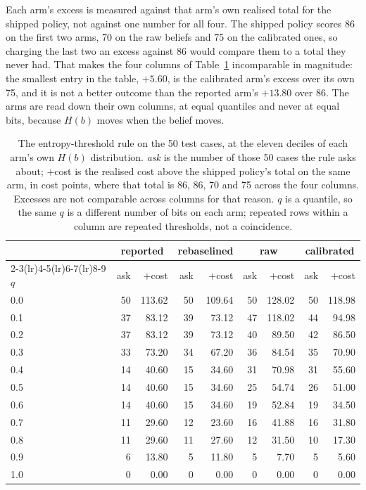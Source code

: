 \documentclass{article}
\begin{document}
Each arm's excess is measured against that arm's own realised total for the shipped
policy, not against one number for all four. The shipped policy scores 86 on the
first two arms, 70 on the raw beliefs and 75 on the calibrated ones, so charging the
last two an excess against 86 would compare them to a total they never had. That
makes the four columns of Table~\ref{tab:entropy} incomparable in magnitude: the
smallest entry in the table, $+5.60$, is the calibrated arm's excess over its own
75, and it is not a better outcome than the reported arm's $+13.80$ over 86. The
arms are read down their own columns, at equal quantiles and never at equal bits,
because $H(b)$ moves when the belief moves.

\begin{table}[t]
\centering
\setlength{\tabcolsep}{3pt}
\small
\begin{tabular}{lrrrrrrrr}
\toprule
& \multicolumn{2}{c}{reported} & \multicolumn{2}{c}{rebaselined}
& \multicolumn{2}{c}{raw} & \multicolumn{2}{c}{calibrated} \\
\cmidrule(lr){2-3}\cmidrule(lr){4-5}\cmidrule(lr){6-7}\cmidrule(lr){8-9}
$q$ & ask & $+$cost & ask & $+$cost & ask & $+$cost & ask & $+$cost \\
\midrule
0.0 & 50 & 113.62 & 50 & 109.64 & 50 & 128.02 & 50 & 118.98 \\
0.1 & 37 & 83.12  & 39 & 73.12  & 47 & 118.02 & 44 & 94.98  \\
0.2 & 37 & 83.12  & 39 & 73.12  & 40 & 89.50  & 42 & 86.50  \\
0.3 & 33 & 73.20  & 34 & 67.20  & 36 & 84.54  & 35 & 70.90  \\
0.4 & 14 & 40.60  & 15 & 34.60  & 31 & 70.98  & 31 & 55.60  \\
0.5 & 14 & 40.60  & 15 & 34.60  & 25 & 54.74  & 26 & 51.00  \\
0.6 & 14 & 40.60  & 15 & 34.60  & 19 & 52.84  & 19 & 34.50  \\
0.7 & 11 & 29.60  & 12 & 23.60  & 16 & 41.88  & 16 & 31.80  \\
0.8 & 11 & 29.60  & 11 & 27.60  & 12 & 31.50  & 10 & 17.30  \\
0.9 & 6  & 13.80  & 5  & 11.80  & 5  & 7.70   & 5  & 5.60   \\
1.0 & 0  & 0.00   & 0  & 0.00   & 0  & 0.00   & 0  & 0.00   \\
\bottomrule
\end{tabular}
\caption{The entropy-threshold rule on the 50 test cases, at the eleven deciles of
each arm's own $H(b)$ distribution. \emph{ask} is the number of those 50 cases the
rule asks about; $+$cost is the realised cost above the shipped policy's total on
the same arm, in cost points, where that total is 86, 86, 70 and 75 across the four
columns. Excesses are not comparable across columns for that reason. $q$ is a
quantile, so the same $q$ is a different number of bits on each arm; repeated rows
within a column are repeated thresholds, not a coincidence.}
\label{tab:entropy}
\end{table}
\end{document}
